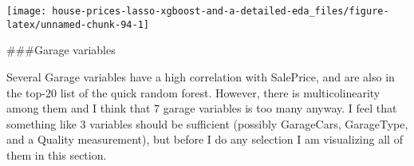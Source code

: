 \documentclass[]{article}
\newenvironment{Shaded}{\begin{snugshade}}{\end{snugshade}}
\newcommand{\CommentTok}[1]{\textcolor[rgb]{0.56,0.35,0.01}{\textit{#1}}}
\newcommand{\DecValTok}[1]{\textcolor[rgb]{0.00,0.00,0.81}{#1}}
\newcommand{\NormalTok}[1]{#1}
\newcommand{\OperatorTok}[1]{\textcolor[rgb]{0.81,0.36,0.00}{\textbf{#1}}}
\newcommand{\StringTok}[1]{\textcolor[rgb]{0.31,0.60,0.02}{#1}}
\begin{document}
\texttt{[image: house-prices-lasso-xgboost-and-a-detailed-eda\_files/figure-latex/unnamed-chunk-94-1]}

\#\#\#Garage variables

Several Garage variables have a high correlation with SalePrice, and are
also in the top-20 list of the quick random forest. However, there is
multicolinearity among them and I think that 7 garage variables is too
many anyway. I feel that something like 3 variables should be sufficient
(possibly GarageCars, GarageType, and a Quality measurement), but before
I do any selection I am visualizing all of them in this section.

\begin{Shaded}
\end{Shaded}
\end{document}
